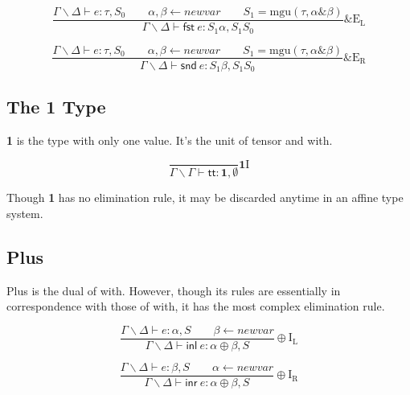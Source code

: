 \documentclass{article}
\newcommand{\one}{\textbf{1}}
\newcommand{\mgu}[2]{\mathrm{mgu}(#1, #2)}
\newcommand{\newvar}{\mathit{newvar}}
\newcommand{\unit}{\textsf{tt}}
\newcommand{\fst}{\textsf{fst} ~}
\newcommand{\snd}{\textsf{snd} ~}
\newcommand{\inl}{\textsf{inl} ~}
\newcommand{\inr}{\textsf{inr} ~}
\begin{document}
\begin{displaymath}
  \frac
    {\Gamma \backslash \Delta \vdash e : \tau, S_0 \qquad
    \alpha, \beta \leftarrow \newvar \qquad
    S_1 = \mgu{\tau}{\alpha \& \beta}}
    {\Gamma \backslash \Delta \vdash \fst e : S_1 \alpha, S_1 S_0}
  \&\mathrm{E_L}
\end{displaymath}

\begin{displaymath}
  \frac
    {\Gamma \backslash \Delta \vdash e : \tau, S_0 \qquad
    \alpha, \beta \leftarrow \newvar \qquad
    S_1 = \mgu{\tau}{\alpha \& \beta}}
    {\Gamma \backslash \Delta \vdash \snd e : S_1 \beta, S_1 S_0}
  \&\mathrm{E_R}
\end{displaymath}

\subsection{The \textbf{1} Type}

\textbf{1} is the type with only one value. It's the unit of tensor and with.

\begin{displaymath}
  \frac
    {}
    {\Gamma \backslash \Gamma \vdash \unit : \one, \emptyset}
  \one\mathrm{I}
\end{displaymath}

Though \textbf{1} has no elimination rule, it may be discarded anytime in an affine type system.

\subsection{Plus}

Plus is the dual of with. However, though its rules are essentially in correspondence with those of with, it has the most complex elimination rule.

\begin{displaymath}
  \frac
    {\Gamma \backslash \Delta \vdash e : \alpha, S \qquad 
    \beta \leftarrow \newvar}
    {\Gamma \backslash \Delta \vdash \inl e : \alpha \oplus \beta, S}
  \oplus \mathrm{I_L}
\end{displaymath}

\begin{displaymath}
  \frac
    {\Gamma \backslash \Delta \vdash e : \beta, S \qquad 
    \alpha \leftarrow \newvar}
    {\Gamma \backslash \Delta \vdash \inr e : \alpha \oplus \beta, S}
  \oplus \mathrm{I_R}
\end{displaymath}
\end{document}
